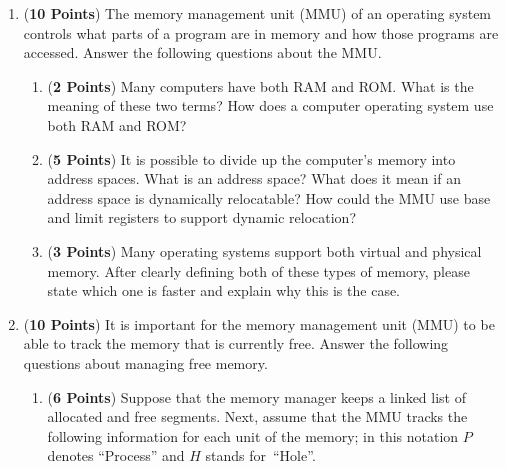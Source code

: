 \documentclass[12pt,epsf,psfig,graphics]{article}
\begin{document}
\begin{enumerate}
  
\item ({\bf 10 Points}) The memory management unit (MMU) of an operating system controls what parts of a program are in
  memory and how those programs are accessed.  Answer the following questions about the MMU.
  
  \begin{enumerate}
          
  \item ({\bf 2 Points}) Many computers have both RAM and ROM.  What is the meaning of these two terms?  How does a
    computer operating system use both RAM and ROM?

  \item ({\bf 5 Points}) It is possible to divide up the computer's memory into address spaces.  What is an address
    space?  What does it mean if an address space is dynamically relocatable? How could the MMU use base and limit
    registers to support dynamic relocation?   

  \item ({\bf 3 Points}) Many operating systems support both virtual and physical memory.  After clearly defining both
    of these types of memory, please state which one is faster and explain why this is the case.
    
  \end{enumerate}
        
\newpage

% 
\item ({\bf 10 Points}) It is important for the memory management unit (MMU) to be able to track the memory that is
  currently free.  Answer the following questions about managing free memory.

  \begin{enumerate}
          
  \item ({\bf 6 Points}) Suppose that the memory manager keeps a linked list of allocated and free segments.  Next,
    assume that the MMU tracks the following information for each unit of the memory; in this notation $P$
    denotes ``Process'' and $H$ stands \mbox{for ``Hole''}.


\end{enumerate}
\end{enumerate}
\end{document}
